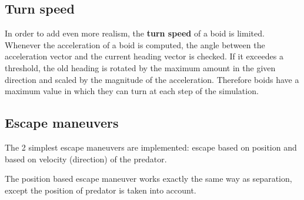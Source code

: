 \documentclass[9pt]{pnas-new}
\begin{document}
\begin{center}
\end{center}

\subsection*{Turn speed}

In order to add even more realism, the \textbf{turn speed} of a boid is limited.
Whenever the acceleration of a boid is computed, the angle between the acceleration vector and the current heading vector is checked.
If it exceedes a threshold, the old heading is rotated by the maximum amount in the given direction and scaled by the magnitude of the acceleration.
Therefore boids have a maximum value in which they can turn at each step of the simulation.

\subsection*{Escape maneuvers}

The 2 simplest escape maneuvers are implemented: escape based on position and based on velocity (direction) of the predator.

The position based escape maneuver works exactly the same way as separation, except the position of predator is taken into account.
\end{document}
